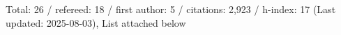 Total: 26 / refereed: 18 / first author: 5 / citations: 2,923 / h-index: 17 (Last updated: 2025-08-03), List attached below